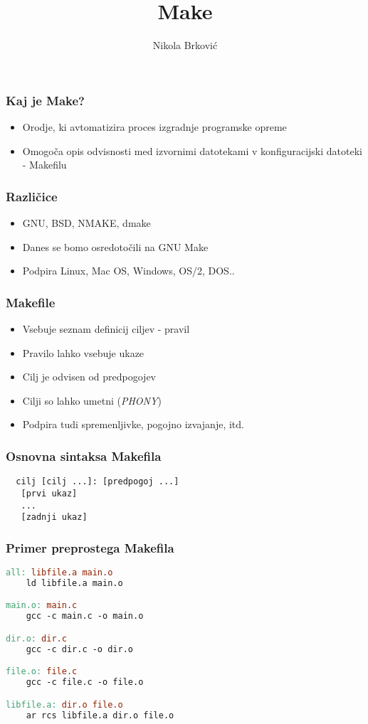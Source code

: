 \documentclass{beamer}
\title{Make}
\author{Nikola Brković}
\begin{document}
\frame{\titlepage}

\begin{frame}
  \frametitle{Kaj je Make?}

  \begin{itemize}
  \item Orodje, ki avtomatizira proces izgradnje programske opreme
  \item Omogoča opis odvisnosti med izvornimi datotekami v
    konfiguracijski datoteki - Makefilu
  \end{itemize}
\end{frame}

\begin{frame}
  \frametitle{Različice}
  
  \begin{itemize}
  \item GNU, BSD, NMAKE, dmake
  \item Danes se bomo osredotočili na GNU Make
  \item Podpira Linux, Mac OS, Windows, OS/2, DOS..
  \end{itemize}
\end{frame}  

\begin{frame}
  \frametitle{Makefile}

  \begin{itemize}
  \item Vsebuje seznam definicij ciljev - pravil
  \item Pravilo lahko vsebuje ukaze
  \item Cilj je odvisen od predpogojev
  \item Cilji so lahko umetni (\textit{PHONY})
  \item Podpira tudi spremenljivke, pogojno izvajanje, itd.
  \end{itemize}
\end{frame}

\begin{frame}[fragile]
  \frametitle{Osnovna sintaksa Makefila}
  
\begin{verbatim}
  cilj [cilj ...]: [predpogoj ...]
   [prvi ukaz]
   ...
   [zadnji ukaz]
\end{verbatim}
\end{frame}

\begin{frame}[t, fragile]
  \frametitle{Primer preprostega Makefila}

\begin{lstlisting}[language=make, frame=single]
all: libfile.a main.o
	ld libfile.a main.o

main.o: main.c
	gcc -c main.c -o main.o

dir.o: dir.c
	gcc -c dir.c -o dir.o

file.o: file.c
	gcc -c file.c -o file.o

libfile.a: dir.o file.o
	ar rcs libfile.a dir.o file.o
\end{lstlisting}
\end{frame}
\end{document}
